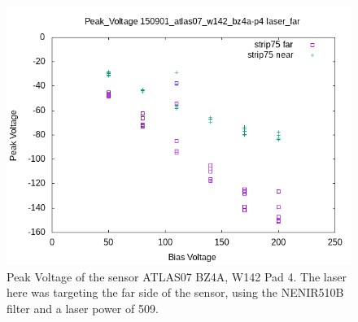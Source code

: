 \documentclass{report}
\begin{document}
            \begin{figure}[h] 
                \includegraphics[height=.4\textheight]{Peak_Voltage__150901_atlas07_w142_bz4a-p4__laser_far}
                \centering
                \caption{ Peak Voltage of the sensor ATLAS07 BZ4A, W142 Pad 4. The laser here was targeting the far side of the sensor, using the NENIR510B filter and a laser power of 509. }
                \label{fig:Peak_Voltage__150901_atlas07_w142_bz4a-p4__laser_far}
            \end{figure}
\end{document}
